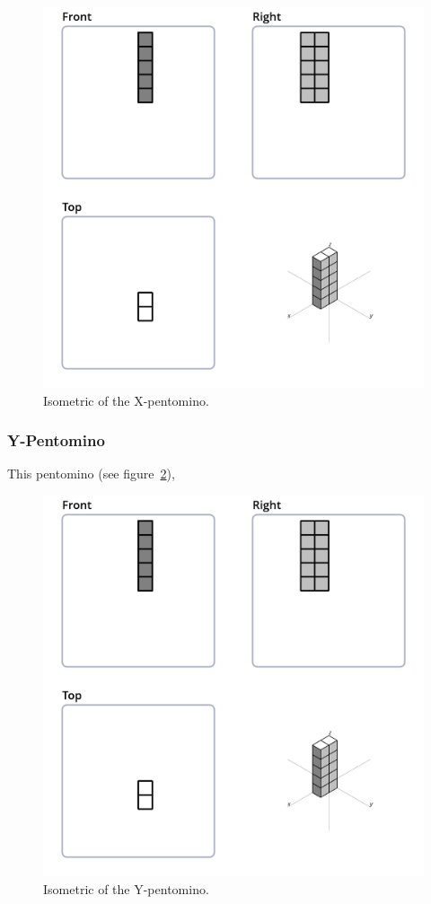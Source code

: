 \begin{figure}
	\centering
	\includegraphics[scale=0.3]{iso_diagrams/o.png}
	\caption{Isometric of the X-pentomino.}
  \label{fig:iso-pent-x}
\end{figure}
\subsubsection{Y-Pentomino}
\label{sec:y-pentomino}
This pentomino (see figure~\ref{fig:iso-pent-y}),


\begin{figure}
	\centering
	\includegraphics[scale=0.3]{iso_diagrams/o.png}
	\caption{Isometric of the Y-pentomino.}
  \label{fig:iso-pent-y}
\end{figure}
